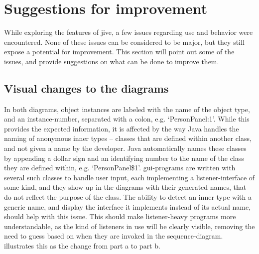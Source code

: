 \section{Suggestions for improvement}\label{jiveSuggestions}

While exploring the features of \gls{jive}, a few issues regarding use and behavior were encountered.
None of these issues can be considered to be major, but they still expose a potential for improvement.
This section will point out some of the issues, and provide suggestions on what can be done to improve them.


\subsection{Visual changes to the diagrams}\label{jiveSuggestionsVisual}
In both diagrams, object instances are labeled with the name of the object type, and an instance-number, separated with a colon, e.g. `PersonPanel:1'.
While this provides the expected information, it is affected by the way Java handles the naming of anonymous inner types -- classes that are defined within another class, and not given a name by the developer.
Java automatically names these classes by appending a dollar sign and an identifying number to the name of the class they are defined within, e.g. `PersonPanel\$1'.
\gls{gui}-programs are written with several such classes to handle user input, each implementing a listener-interface of some kind, and they show up in the diagrams with their generated names, that do not reflect the purpose of the class.
The ability to detect an inner type with a generic name, and display the interface it implements instead of its actual name, should help with this issue.
This should make listener-heavy programs more understandable, as the kind of listeners in use will be clearly visible, removing the need to guess based on when they are invoked in the sequence-diagram.
 illustrates this as the change from part a to part b.


